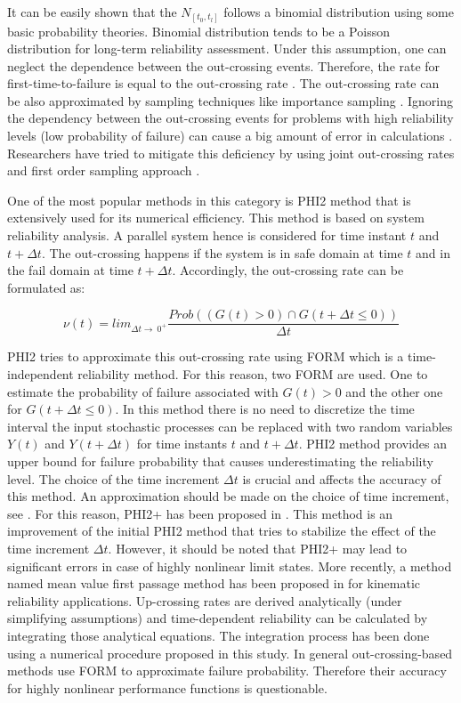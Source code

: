 It can be easily shown that the $N_{[t_0,t_l]}$ follows a binomial distribution using some basic probability theories. Binomial distribution tends to be a 
Poisson distribution for long-term reliability assessment. Under this assumption, one can neglect the dependence between the out-crossing events. Therefore, 
the rate for first-time-to-failure is equal to the out-crossing rate \cite{Ponte1985}. The out-crossing rate can be also approximated by sampling techniques 
like importance sampling \cite{Singh2011}. Ignoring the dependency between the out-crossing events for problems with high reliability levels (low probability
of failure) can cause a big amount of error in calculations \cite{Zhang2011, LUTES2009, Surdet2008}. Researchers have tried to mitigate this deficiency by 
using joint out-crossing rates \cite{Hu2013} and first order sampling approach \cite{Hu2015}. 

One of the most popular methods in this category is PHI2 method \cite{ANDRIEURENAUD200475} that is extensively used for its numerical efficiency. This method
is based on system reliability analysis. A parallel system hence is considered for time instant $t$ and $t+\Delta t$. The out-crossing happens if the system is 
in safe domain at time $t$ and in the fail domain at time $t+\Delta t$. Accordingly, the out-crossing rate can be formulated as: 

\begin{equation}
\nu (t)= lim_{\Delta t \to\ 0^+}\frac{Prob((G(t)>0)\cap G(t+\Delta t\leq0))}{\Delta t}
\label{eqation: phi2out}
\end{equation}

PHI2 tries to approximate this out-crossing rate using FORM which is a time-independent reliability method. For this reason, two FORM are used. One to estimate 
the probability of failure associated with $G(t)>0$ and the other one for $G(t+\Delta t\leq0)$. In this method there is no need to discretize the time interval 
the input stochastic processes can be replaced with two random variables $Y(t)$ and $Y(t+\Delta t)$ for time instants $t$ and $t +\Delta t$. 
PHI2 method provides an upper bound for failure probability that causes underestimating the reliability level. The choice of the time increment $\Delta t$ is 
crucial and affects the accuracy of this method. An approximation should be made on the choice of time increment, see \citep{Surdet2008}. For this reason, 
PHI2+ has been proposed in \cite{Surdet2008}. This method is an improvement of the initial PHI2 method that tries to stabilize the effect of the time increment 
$\Delta t$. However, it should be noted that PHI2+ may lead to significant errors in case of highly nonlinear limit states. More recently, a method named mean 
value first passage method has been proposed in \cite{Zhang2011, Du2012} for kinematic reliability applications. Up-crossing rates are derived analytically 
(under simplifying assumptions) and time-dependent reliability can be calculated by integrating those analytical equations. The integration process has been 
done using a numerical procedure proposed in this study. In general out-crossing-based methods use FORM to approximate failure probability. Therefore 
their accuracy for highly nonlinear performance functions is questionable.

